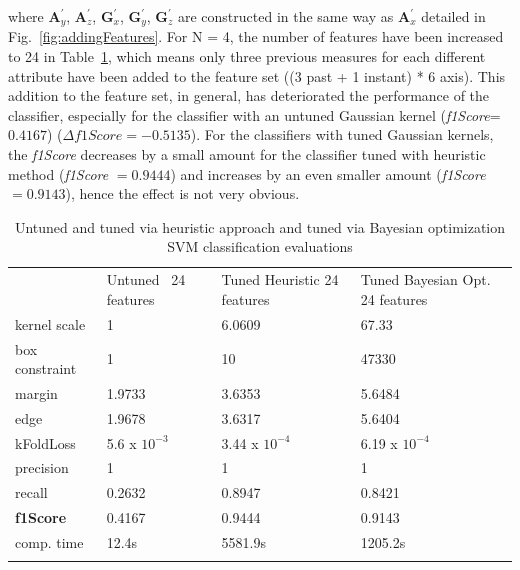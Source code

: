 where $\bm{A}_y^{'}$, $\bm{A}_z^{'}$, $\bm{G}_x^{'}$, $\bm{G}_y^{'}$, $\bm{G}_z^{'}$ are constructed in the same way as  $\bm{A}_x^{'}$ detailed in Fig.~\ref{fig:addingFeatures}.
For N = 4, the number of features have been increased to 24 in Table~\ref{tab:contSurfStuckAddedFeat}, which means only three previous measures for each different attribute have been added to the feature set ((3 past + 1 instant) * 6 axis).
This addition to the feature set, in general, has deteriorated the performance of the classifier, especially for the classifier with an untuned Gaussian kernel (\emph{f1Score}= $0.4167$) ($\Delta f1Score = -0.5135$). 
For the classifiers with tuned Gaussian kernels, the \emph{f1Score} decreases by a small amount for the classifier tuned with heuristic method (\emph{f1Score} $= 0.9444$) and increases by an even smaller amount (\emph{f1Score} $= 0.9143$), hence the effect is not very obvious. 


\begin{table}[h]
	\centering
\caption{Untuned and tuned via heuristic approach and tuned via Bayesian optimization SVM classification evaluations}
\label{tab:contSurfStuckAddedFeat}       %
\begin{tabular}{p{2.6cm}p{2cm}p{2.5cm}p{2.7cm}}
\hline\noalign{\smallskip}
 & Untuned \ 24 features & Tuned Heuristic 24 features & Tuned Bayesian Opt. 24 features\\
\noalign{\smallskip}\hline\noalign{\smallskip}
kernel scale & 1 & 6.0609 & 67.33 \\
box constraint & 1 & 10 &  47330\\
margin & 1.9733 & 3.6353 & 5.6484 \\
edge & 1.9678 & 3.6317 & 5.6404 \\
kFoldLoss & 5.6 x $10^{-3}$ & 3.44 x $10^{-4}$ & 6.19 x $10^{-4}$ \\
precision & 1 & 1 & 1 \\
recall & 0.2632 & 0.8947 & 0.8421\\
\textbf{f1Score} & 0.4167 & 0.9444 & 0.9143 \\
comp. time & 12.4s & 5581.9s &1205.2s \\
\noalign{\smallskip}\hline
\end{tabular}
\end{table}

